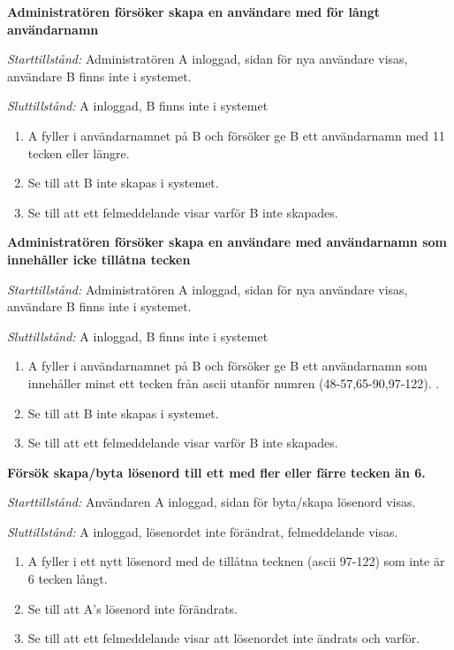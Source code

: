 \documentclass[a4paper]{article}
\begin{document}
\begin{FT}
\item
\textbf{Administratören försöker skapa en användare med för långt användarnamn}

\emph{Starttillstånd:} Administratören A inloggad, sidan för nya användare visas, användare B finns inte i systemet.

\emph{Sluttillstånd:} A inloggad, B finns inte i systemet

\begin{enumerate}
\item A fyller i användarnamnet på B och försöker ge B ett användarnamn med 11 tecken eller längre.
\item Se till att B inte skapas i systemet.
\item Se till att ett felmeddelande visar varför B inte skapades.
\end{enumerate}

\item
\textbf{Administratören försöker skapa en användare med användarnamn som innehåller icke tillåtna tecken}

\emph{Starttillstånd:} Administratören A inloggad, sidan för nya användare visas, användare B finns inte i systemet.

\emph{Sluttillstånd:} A inloggad, B finns inte i systemet

\begin{enumerate}
\item A fyller i användarnamnet på B och försöker ge B ett användarnamn som innehåller minst ett tecken från ascii utanför numren (48-57,65-90,97-122).  .
\item Se till att B inte skapas i systemet.
\item Se till att ett felmeddelande visar varför B inte skapades.
\end{enumerate}

\item
\textbf{Försök skapa/byta lösenord till ett med fler eller färre tecken än 6.}

\emph{Starttillstånd:} Användaren A inloggad, sidan för byta/skapa lösenord visas.

\emph{Sluttillstånd:} A inloggad, lösenordet inte förändrat, felmeddelande visas.

\begin{enumerate}
\item A fyller i ett nytt lösenord med de tillåtna tecknen (ascii 97-122) som inte är 6 tecken långt.
\item Se till att A's lösenord inte förändrats.
\item Se till att ett felmeddelande visar att lösenordet inte ändrats och varför.
\end{enumerate}


\end{FT}
\end{document}
